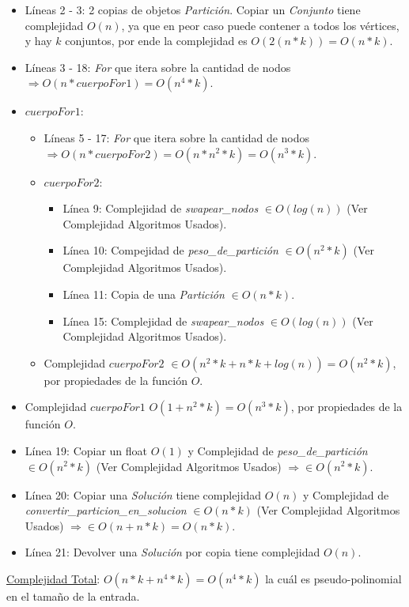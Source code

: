 \documentclass[10pt,a4paper]{article}
\begin{document}
\begin{itemize}
\item Líneas 2 - 3: 2 copias de objetos \textit{Partición}. Copiar un \textit{Conjunto} tiene complejidad $O(n)$, ya que en peor caso puede contener a todos los vértices, y hay $k$ conjuntos, por ende la complejidad es $O(2(n*k)) = O(n*k)$.
\item Líneas 3 - 18: \textit{For} que itera sobre la cantidad de nodos $\Rightarrow O(n * cuerpoFor1) = O(n^4 * k)$.
\item $cuerpoFor1$:
\begin{itemize}
\item Líneas 5 - 17: \textit{For} que itera sobre la cantidad de nodos $\Rightarrow O(n * cuerpoFor2) = O(n*n^2*k) = O(n^3 * k)$.
\item $cuerpoFor2$: 
\begin{itemize}
\item Línea 9: Complejidad de \textit{swapear\_nodos} $\in O(log(n))$ (Ver Complejidad Algoritmos Usados).
\item Línea 10: Compejidad de \textit{peso\_de\_partición} $\in O(n^2*k)$ (Ver Complejidad Algoritmos Usados).
\item Línea 11: Copia de una \textit{Partición} $\in O(n*k)$.
\item Línea 15: Complejidad de \textit{swapear\_nodos} $\in O(log(n))$ (Ver Complejidad Algoritmos Usados).
\end{itemize}
\item Complejidad $cuerpoFor2$ $\in O(n^2*k + n*k + log(n)) = O(n^2*k)$, por propiedades de la función $O$.
\end{itemize}
\item Complejidad $cuerpoFor1$ $O(1 + n^2*k) = O(n^3 * k)$, por propiedades de la función $O$.
\item Línea 19: Copiar un float $O(1)$ y Complejidad de \textit{peso\_de\_partición} $\in O(n^2*k)$ (Ver Complejidad Algoritmos Usados) $\Rightarrow \in O(n^2*k)$.
\item Línea 20: Copiar una \textit{Solución} tiene complejidad $O(n)$ y Complejidad de \textit{convertir\_particion\_en\_solucion} $\in O(n*k)$ (Ver Complejidad Algoritmos Usados) $\Rightarrow \in O(n + n*k) = O(n*k)$.
\item Línea 21: Devolver una \textit{Solución} por copia tiene complejidad $O(n)$.
\end{itemize}

\noindent \underline{Complejidad Total}: $O(n*k + n^4*k) = O(n^4*k)$ la cuál es pseudo-polinomial en el tamaño de la entrada.
\end{document}
